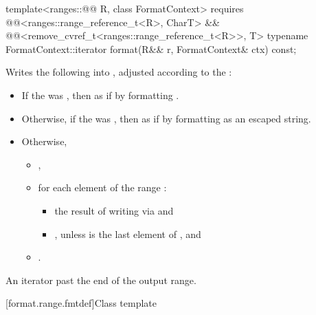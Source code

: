 %
\begin{itemdecl}
template<ranges::@@ R, class FormatContext>
    requires @@<ranges::range_reference_t<R>, CharT> &&
             @@<remove_cvref_t<ranges::range_reference_t<R>>, T>
  typename FormatContext::iterator
    format(R&& r, FormatContext& ctx) const;
\end{itemdecl}

\begin{itemdescr}
\pnum
\effects
Writes the following into ,
adjusted according to the :

\begin{itemize}
\item
If the  was ,
then as if by formatting .
\item
Otherwise, if the  was ,
then as if by formatting 
as an escaped string.
\item
Otherwise,
\begin{itemize}
\item
{},
\item
for each element  of the range :
\begin{itemize}
\item
the result of writing  via  and
\item
{}, unless  is the last element of , and
\end{itemize}
\item
{}.
\end{itemize}
\end{itemize}

\pnum
\returns
An iterator past the end of the output range.
\end{itemdescr}

[format.range.fmtdef]{Class template }

